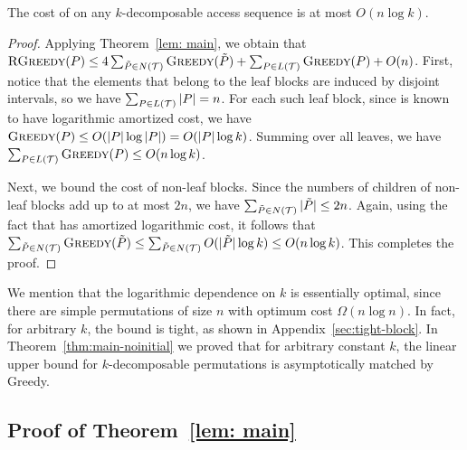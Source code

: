\begin{theorem} 
The cost of \agreedy on any $k$-decomposable access sequence is at most $O(n \log k)$. %
\end{theorem}  
\begin{proof} 
Applying Theorem~\ref{lem: main}, we obtain that $\textsc{RGreedy}(P) \leq 4 \sum_{\tilde{P} \in N({\mathcal T})} \textsc{Greedy}(\tilde{P}) + \sum_{P \in L({\mathcal T})} \textsc{Greedy}(P) +O(n)$. 
First, notice that the elements that belong to the leaf blocks are induced by disjoint intervals, so we have $\sum_{P \in L({\mathcal T})} |P| = n $. 
For each such leaf block, since \greedy is known to have logarithmic amortized cost, we have $\textsc{Greedy}(P) \leq O(|P| \log |P|) = O(|P| \log k)$. Summing over all leaves, we have $\sum_{P \in L({\mathcal T})} \textsc{Greedy}(P) \leq O(n \log k)$.

Next, we bound the cost of non-leaf blocks. 
Since the numbers of children of non-leaf blocks add up to at most $2n$, we have $\sum_{\tilde{P} \in N({\mathcal T})} |\tilde{P}| \leq 2n$. %
Again, using the fact that \greedy has amortized logarithmic cost, it follows that $\sum_{\tilde{P} \in N({\mathcal T})} \textsc{Greedy}(\tilde{P}) \leq \sum_{\tilde{P} \in N({\mathcal T})} O(|\tilde{P}| \log k) \leq O(n \log k)$.
This completes the proof.      
\end{proof} 

We mention that the logarithmic dependence on $k$ is essentially optimal, since there are simple permutations of size $n$ with optimum cost $\Omega(n \log n)$. In fact, for arbitrary $k$, the bound is tight, as shown in Appendix~\ref{sec:tight-block}. In Theorem~\ref{thm:main-noinitial} we proved that for arbitrary constant $k$, the linear upper bound for $k$-decomposable permutations is asymptotically matched by {\sc Greedy}.



\subsection{Proof of Theorem~\ref{lem: main}}

